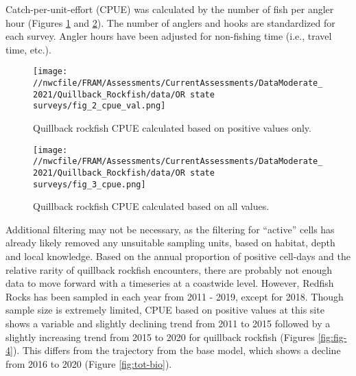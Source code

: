 \documentclass[11pt,
  english,
  a4paper,
]{article}
\begin{document}

Catch-per-unit-effort (CPUE) was calculated by the number of fish per angler hour (Figures \ref{fig:fig-2} and \ref{fig:fig-3}). The number of anglers and hooks are standardized for each survey. Angler hours have been adjusted for non-fishing time (i.e., travel time, etc.).

\leavevmode\tagmcend\tagstructend\par


\begin{figure}
\centering
\texttt{[image: //nwcfile/FRAM/Assessments/CurrentAssessments/DataModerate\_2021/Quillback\_Rockfish/data/OR state surveys/fig\_2\_cpue\_val.png]}
\caption{Quillback rockfish CPUE calculated based on positive values only.\label{fig:fig-2}}
\end{figure}

\tagmcend\tagstructend


\begin{figure}
\centering
\texttt{[image: //nwcfile/FRAM/Assessments/CurrentAssessments/DataModerate\_2021/Quillback\_Rockfish/data/OR state surveys/fig\_3\_cpue.png]}
\caption{Quillback rockfish CPUE calculated based on all values.\label{fig:fig-3}}
\end{figure}

\tagmcend\tagstructend


Additional filtering may not be necessary, as the filtering for ``active'' cells has already likely removed any unsuitable sampling units, based on habitat, depth and local knowledge. Based on the annual proportion of positive cell-days and the relative rarity of quillback rockfish encounters, there are probably not enough data to move forward with a timeseries at a coastwide level. However, Redfish Rocks has been sampled in each year from 2011 - 2019, except for 2018. Though sample size is extremely limited, CPUE based on positive values at this site shows a variable and slightly declining trend from 2011 to 2015 followed by a slightly increasing trend from 2015 to 2020 for quillback rockfish (Figures \ref{fig:fig-4}). This differs from the trajectory from the base model, which shows a decline from 2016 to 2020 (Figure \ref{fig:tot-bio}).
\end{document}
